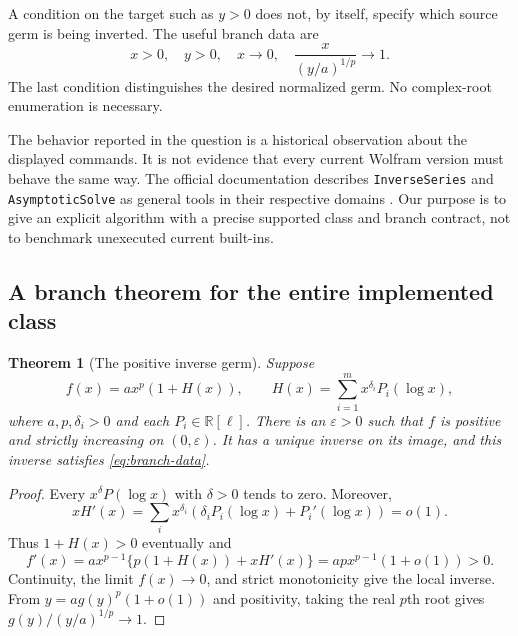 \documentclass[11pt,a4paper]{article}
\numberwithin{equation}{section}
\newtheorem{theorem}{Theorem}[section]
\theoremstyle{definition}\newtheorem{definition}[theorem]{Definition}
\theoremstyle{remark}\newtheorem{remark}[theorem]{Remark}
\newcommand{\R}{\mathbb R}\newcommand{\C}{\mathbb C}\newcommand{\N}{\mathbb N}
\newcommand{\code}[1]{\texttt{#1}}
\begin{document}
A condition on the target such as $y>0$ does not, by itself, specify which
source germ is being inverted. The useful branch data are
\begin{equation}
 x>0,\quad y>0,\quad x\to0,\quad
 \frac{x}{(y/a)^{1/p}}\to1.
 \label{eq:branch-data}
\end{equation}
The last condition distinguishes the desired normalized germ. No
complex-root enumeration is necessary.

The behavior reported in the question is a historical observation about
the displayed commands. It is not evidence that every current Wolfram
version must behave the same way. The official documentation describes
\code{InverseSeries} and \code{AsymptoticSolve} as general tools in their
respective domains \cite{wl-inverse,wl-asymptotic}. Our purpose is to give
an explicit algorithm with a precise supported class and branch contract,
not to benchmark unexecuted current built-ins.

\subsection{A branch theorem for the entire implemented class}

\begin{theorem}[The positive inverse germ]
\label{thm:branch}
Suppose
\begin{equation}
 f(x)=a x^p(1+H(x)),\qquad
 H(x)=\sum_{i=1}^m x^{\delta_i}P_i(\log x),
 \label{eq:model}
\end{equation}
where $a,p,\delta_i>0$ and each $P_i\in\R[\ell]$. There is an
$\varepsilon>0$ such that $f$ is positive and strictly increasing on
$(0,\varepsilon)$. It has a unique inverse on its image, and this inverse
satisfies \cref{eq:branch-data}.
\end{theorem}

\begin{proof}
Every $x^\delta P(\log x)$ with $\delta>0$ tends to zero. Moreover,
\begin{equation}
 xH'(x)=\sum_i x^{\delta_i}
  \left(\delta_iP_i(\log x)+P_i'(\log x)\right)=o(1).
 \label{eq:derivative-small}
\end{equation}
Thus $1+H(x)>0$ eventually and
\[
 f'(x)=a x^{p-1}\{p(1+H(x))+xH'(x)\}
       =ap x^{p-1}(1+o(1))>0.
\]
Continuity, the limit $f(x)\to0$, and strict monotonicity give the local
inverse. From $y=a g(y)^p(1+o(1))$ and positivity, taking the real $p$th
root gives $g(y)/(y/a)^{1/p}\to1$.
\end{proof}
\end{document}

